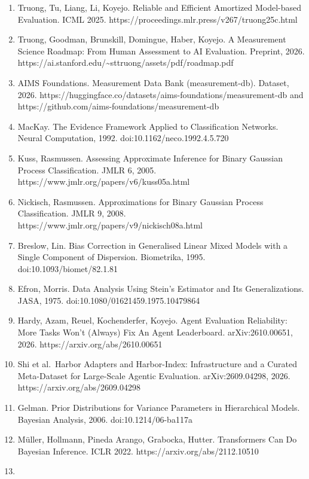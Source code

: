 \documentclass[
]{article}
\providecommand{\tightlist}{%
  \setlength{\itemsep}{0pt}\setlength{\parskip}{0pt}}
\begin{document}
\begin{enumerate}
\def\labelenumi{\arabic{enumi}.}
\tightlist
\item
  Truong, Tu, Liang, Li, Koyejo. Reliable and Efficient Amortized
  Model-based Evaluation. ICML 2025.
  https://proceedings.mlr.press/v267/truong25c.html
\item
  Truong, Goodman, Brunskill, Domingue, Haber, Koyejo. A Measurement
  Science Roadmap: From Human Assessment to AI Evaluation. Preprint,
  2026.
  https://ai.stanford.edu/\textasciitilde sttruong/assets/pdf/roadmap.pdf
\item
  AIMS Foundations. Measurement Data Bank (measurement-db). Dataset,
  2026. https://huggingface.co/datasets/aims-foundations/measurement-db
  and https://github.com/aims-foundations/measurement-db
\item
  MacKay. The Evidence Framework Applied to Classification Networks.
  Neural Computation, 1992. doi:10.1162/neco.1992.4.5.720
\item
  Kuss, Rasmussen. Assessing Approximate Inference for Binary Gaussian
  Process Classification. JMLR 6, 2005.
  https://www.jmlr.org/papers/v6/kuss05a.html
\item
  Nickisch, Rasmussen. Approximations for Binary Gaussian Process
  Classification. JMLR 9, 2008.
  https://www.jmlr.org/papers/v9/nickisch08a.html
\item
  Breslow, Lin. Bias Correction in Generalised Linear Mixed Models with
  a Single Component of Dispersion. Biometrika, 1995.
  doi:10.1093/biomet/82.1.81
\item
  Efron, Morris. Data Analysis Using Stein's Estimator and Its
  Generalizations. JASA, 1975. doi:10.1080/01621459.1975.10479864
\item
  Hardy, Azam, Reuel, Kochenderfer, Koyejo. Agent Evaluation
  Reliability: More Tasks Won't (Always) Fix An Agent Leaderboard.
  arXiv:2610.00651, 2026. https://arxiv.org/abs/2610.00651
\item
  Shi et al.~Harbor Adapters and Harbor-Index: Infrastructure and a
  Curated Meta-Dataset for Large-Scale Agentic Evaluation.
  arXiv:2609.04298, 2026. https://arxiv.org/abs/2609.04298
\item
  Gelman. Prior Distributions for Variance Parameters in Hierarchical
  Models. Bayesian Analysis, 2006. doi:10.1214/06-ba117a
\item
  Müller, Hollmann, Pineda Arango, Grabocka, Hutter. Transformers Can Do
  Bayesian Inference. ICLR 2022. https://arxiv.org/abs/2112.10510
\item

\end{enumerate}
\end{document}
